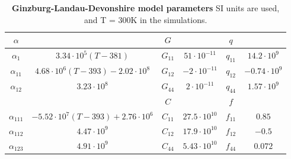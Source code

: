 \begin{table}
\begin{tabular}{|c|c|c|c|c|c|}
	\hline
	 $\alpha$ & & $G$ & & $q$ &\\
	 \hline
	 $\alpha_1$ & $3.34\cdot 10^5 (T - 381)$  & $G_{11}$ & $51 \cdot 10^{-11}$ & $q_{11}$ & $14.2 \cdot 10^{9}$ \\
	 $\alpha_{11}$ & $4.68 \cdot 10^6 (T-393) - 2.02 \cdot 10^8$ & $G_{12}$ & $-2 \cdot 10^{-11}$ & $q_{12}$ & $-0.74 \cdot 10^{9}$ \\
	 $\alpha_{12}$ & $3.23 \cdot 10^8$ & $G_{44}$ & $2 \cdot 10^{-11}$  & $q_{44}$ & $1.57 \cdot 10^{9}$ \\
	 \cline{3-6}
	 & & $C$ & & $f$ &\\
	 \cline{3-6}
	 $\alpha_{111}$ & $-5.52 \cdot 10^7 (T - 393) + 2.76 \cdot 10^6 $ & $C_{11}$ & $27.5 \cdot 10^{10}$ & $f_{11}$ & $0.85$ \\
	 $\alpha_{112}$ &  $4.47 \cdot 10^9 $ & $C_{12}$ & $17.9 \cdot 10^{10}$ & $f_{12}$ & $-0.5$  \\
	 $\alpha_{123}$ & $4.91 \cdot 10^9$ &$C_{44}$ & $5.43 \cdot 10^{10}$ & $f_{44}$ & $ 0.072$ \\
	 \hline
\end{tabular}
\caption{{\bf Ginzburg-Landau-Devonshire model parameters} SI units are used, and T = 300K in the simulations.}
\end{table}

